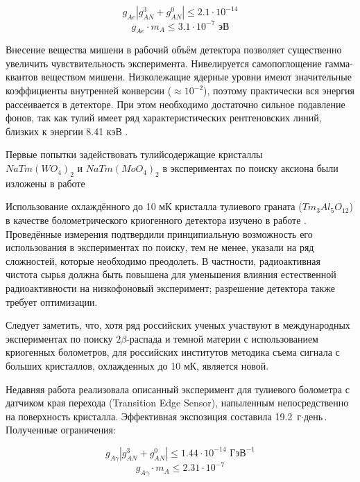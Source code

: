 \documentclass[a4paper,article,14pt]{extarticle}
\begin{document}
\begin{equation}
    {g_{Ae }}\left| {g_{AN}^3 + g_{AN}^0} \right| \leqslant 2.1 \cdot {10^{ - 14}}
\end{equation}
\begin{equation}
{g_{Ae }} \cdot {m_A} \leqslant 3.1 \cdot {10^{ - 7}} \text{ эВ}
\end{equation}

Внесение вещества мишени в рабочий объём детектора позволяет существенно увеличить чувствительность эксперимента. Нивелируется самопоглощение гамма-квантов веществом мишени. Низколежащие ядерные уровни имеют значительные коэффициенты внутренней конверсии  ($\approx 10^{-2}$), поэтому практически вся энергия рассеивается в детекторе. При этом необходимо достаточно сильное подавление фонов, так как тулий имеет ряд характеристических рентгеновских линий, близких к энергии 8.41 кэВ \cite{Derbin2009}.

Первые попытки задействовать тулийсодержащие кристаллы \\ $NaTm{\left( {W{O_4}} \right)_2}$ и $NaTm{\left( {Mo{O_4}} \right)_2}$ в экспериментах по поиску аксиона были изложены в работе \cite{tm_first}

Использование охлаждённого до 10 мК кристалла тулиевого граната ($Tm_3Al_5O_{12}$) в качестве болометрического криогенного детектора изучено в работе \cite{test_bolometric_tm}. Проведённые измерения подтвердили принципиальную возможность его использования в экспериментах по поиску, тем не менее, указали на ряд сложностей, которые необходимо преодолеть. В частности, радиоактивная чистота сырья должна быть повышена для уменьшения влияния естественной радиоактивности на низкофоновый эксперимент; разрешение детектора также требует оптимизации.

Следует заметить, что, хотя ряд российских ученых участвуют в международных экспериментах по поиску $2\beta$-распада и темной материи с использованием криогенных болометров, для российских институтов методика съема сигнала с больших кристаллов, охлажденных до 10 мК, является новой.

Недавняя работа \cite{newlimits_tm} реализовала описанный эксперимент для тулиевого болометра с датчиком края перехода (Transition Edge Sensor), напыленным непосредственно на поверхность кристалла. Эффективная экспозиция составила 19.2 $\text{г} \cdot \text{день}$. Полученные ограничения:

\begin{equation}
    {g_{A\gamma }}\left| {g_{AN}^3 + g_{AN}^0} \right| \leqslant 1.44 \cdot {10^{ - 14}} \text{ ГэВ}^{-1}
\end{equation}
\begin{equation}
{g_{A\gamma }} \cdot {m_A} \leqslant 2.31 \cdot {10^{ - 7}}
\end{equation}
\end{document}
